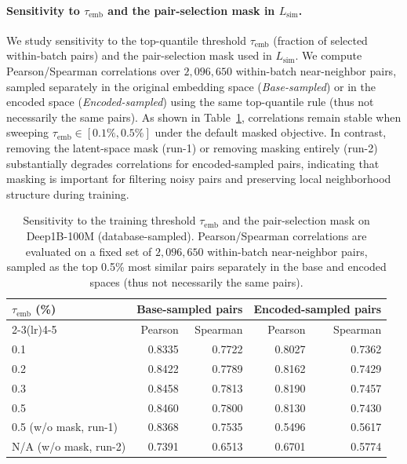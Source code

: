 \documentclass[sigconf, nonacm]{acmart}
\begin{document}
\paragraph{Sensitivity to $\tau_{\text{emb}}$ and the pair-selection mask in $L_{\text{sim}}$.}
We study sensitivity to the top-quantile threshold $\tau_{\text{emb}}$ (fraction of selected within-batch pairs) and the pair-selection mask used in $L_{\text{sim}}$.
We compute Pearson/Spearman correlations over $2{,}096{,}650$ within-batch near-neighbor pairs, sampled separately in the original embedding space (\emph{Base-sampled}) or in the encoded space (\emph{Encoded-sampled}) using the same top-quantile rule (thus not necessarily the same pairs).
As shown in Table~\ref{tab:tau_mask_ablation}, correlations remain stable when sweeping $\tau_{\text{emb}}\in[0.1\%,0.5\%]$ under the default masked objective.
In contrast, removing the latent-space mask (run-1) or removing masking entirely (run-2) substantially degrades correlations for encoded-sampled pairs, indicating that masking is important for filtering noisy pairs and preserving local neighborhood structure during training.




\begin{table}[t]
\centering
\small
\setlength{\tabcolsep}{4pt}
\renewcommand{\arraystretch}{1.05}
\caption{Sensitivity to the training threshold $\tau_{\text{emb}}$ and the pair-selection mask on Deep1B-100M (database-sampled). Pearson/Spearman correlations are evaluated on a fixed set of $2{,}096{,}650$ within-batch near-neighbor pairs, sampled as the top 0.5\% most similar pairs separately in the base and encoded spaces (thus not necessarily the same pairs).}

\label{tab:tau_mask_ablation}
\begin{tabular}{lrrrr}
\toprule
\multirow{2}{*}{$\tau_{\text{emb}}$ (\%)} & \multicolumn{2}{c}{Base-sampled pairs} & \multicolumn{2}{c}{Encoded-sampled pairs} \\
\cmidrule(lr){2-3}\cmidrule(lr){4-5}
 & Pearson & Spearman & Pearson & Spearman \\
\midrule
0.1 & 0.8335 & 0.7722 & 0.8027 & 0.7362 \\
0.2 & 0.8422 & 0.7789 & 0.8162 & 0.7429 \\
0.3 & 0.8458 & 0.7813 & 0.8190 & 0.7457 \\
0.5 & 0.8460 & 0.7800 & 0.8130 & 0.7430 \\
\midrule
0.5 (w/o mask, run-1) & 0.8368 & 0.7535 & 0.5496 & 0.5617 \\
N/A (w/o mask, run-2) & 0.7391 & 0.6513 & 0.6701 & 0.5774 \\
\bottomrule
\end{tabular}
\end{table}
\end{document}
